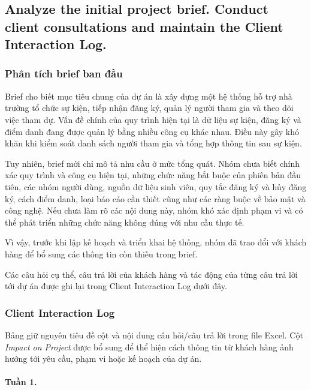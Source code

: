 \subsection{Analyze the initial project brief. Conduct client consultations and maintain the Client Interaction Log.}

\subsubsection{Phân tích brief ban đầu}

Brief cho biết mục tiêu chung của dự án là xây dựng một hệ thống hỗ trợ nhà trường tổ chức sự kiện, tiếp nhận đăng ký, quản lý người tham gia và theo dõi việc tham dự. Vấn đề chính của quy trình hiện tại là dữ liệu sự kiện, đăng ký và điểm danh đang được quản lý bằng nhiều công cụ khác nhau. Điều này gây khó khăn khi kiểm soát danh sách người tham gia và tổng hợp thông tin sau sự kiện.

Tuy nhiên, brief mới chỉ mô tả nhu cầu ở mức tổng quát. Nhóm chưa biết chính xác quy trình và công cụ hiện tại, những chức năng bắt buộc của phiên bản đầu tiên, các nhóm người dùng, nguồn dữ liệu sinh viên, quy tắc đăng ký và hủy đăng ký, cách điểm danh, loại báo cáo cần thiết cũng như các ràng buộc về bảo mật và công nghệ. Nếu chưa làm rõ các nội dung này, nhóm khó xác định phạm vi và có thể phát triển những chức năng không đúng với nhu cầu thực tế.

Vì vậy, trước khi lập kế hoạch và triển khai hệ thống, nhóm đã trao đổi với khách hàng để bổ sung các thông tin còn thiếu trong brief.

Các câu hỏi cụ thể, câu trả lời của khách hàng và tác động của từng câu trả lời tới dự án được ghi lại trong Client Interaction Log dưới đây.

\subsubsection{Client Interaction Log}

Bảng giữ nguyên tiêu đề cột và nội dung câu hỏi/câu trả lời trong file Excel. Cột \emph{Impact on Project} được bổ sung để thể hiện cách thông tin từ khách hàng ảnh hưởng tới yêu cầu, phạm vi hoặc kế hoạch của dự án.

\Needspace{4cm}
\paragraph*{Tuần 1.}

